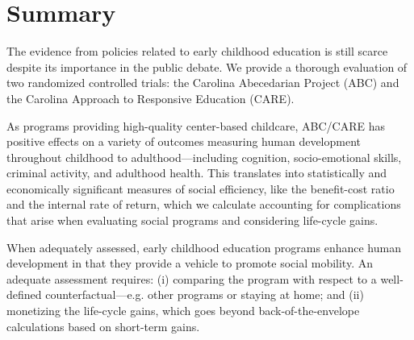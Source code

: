 \section{Summary} \label{section:conclusion}

The evidence from policies related to early childhood education is still scarce despite its importance in the public debate. We provide a thorough evaluation of two randomized controlled trials: the Carolina Abecedarian Project (ABC) and the Carolina Approach to Responsive Education (CARE).

As programs providing high-quality center-based childcare, ABC/CARE has positive effects on a variety of outcomes measuring human development throughout childhood to adulthood---including cognition, socio-emotional skills, criminal activity, and adulthood health. This translates into statistically and economically significant measures of social efficiency, like the benefit-cost ratio and the internal rate of return, which we calculate accounting for complications that arise when evaluating social programs and considering life-cycle gains.

When adequately assessed, early childhood education programs enhance human development in that they provide a vehicle to promote social mobility. An adequate assessment requires: (i) comparing the program with respect to a well-defined counterfactual---e.g. other programs or staying at home; and (ii) monetizing the life-cycle gains, which goes beyond back-of-the-envelope calculations based on short-term gains.

\clearpage

\singlespace



 